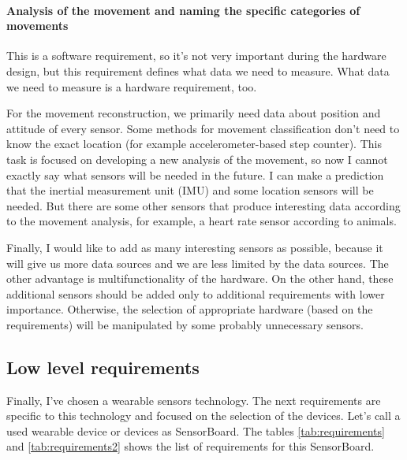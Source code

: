 \paragraph{Analysis of the movement and naming the specific categories of movements} This is a software requirement, so it's not very important during the hardware design, but this requirement defines what data we need to measure. What data we need to measure is a hardware requirement, too.

For the movement reconstruction, we primarily need data about position and attitude of every sensor. Some methods for movement classification don't need to know the exact location (for example accelerometer-based step counter). This task is focused on developing a new analysis of the movement, so now I cannot exactly say what sensors will be needed in the future. I can make a prediction that the inertial measurement unit (\ac{IMU}) and some location sensors will be needed. But there are some other sensors that produce interesting data according to the movement analysis, for example, a heart rate sensor according to animals.

Finally, I would like to add as many interesting sensors as possible, because it will give us more data sources and we are less limited by the data sources. The other advantage is multifunctionality of the hardware. On the other hand, these additional sensors should be added only to additional requirements with lower importance. Otherwise, the selection of appropriate hardware (based on the requirements) will be manipulated by some probably unnecessary sensors.

\subsection{Low level requirements}
Finally, I've chosen a wearable sensors technology. The next requirements are specific to this technology and focused on the selection of the devices. Let's call a used wearable device or devices as SensorBoard. The tables \ref{tab:requirements} and \ref{tab:requirements2} shows the list of requirements for this SensorBoard.

